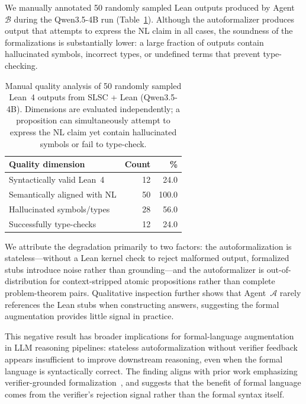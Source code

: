 We manually annotated 50 randomly sampled Lean outputs produced by Agent $\mathcal{B}$ during the Qwen3.5-4B run (Table~\ref{tab:lean_quality}). Although the autoformalizer produces output that attempts to express the NL claim in all cases, the soundness of the formalizations is substantially lower: a large fraction of outputs contain hallucinated symbols, incorrect types, or undefined terms that prevent type-checking.

\begin{table}[t]
  \centering
  \small
  \caption{Manual quality analysis of 50 randomly sampled Lean~4 outputs from SLSC + Lean (Qwen3.5-4B). Dimensions are evaluated independently; a proposition can simultaneously attempt to express the NL claim yet contain hallucinated symbols or fail to type-check.}
  \label{tab:lean_quality}
  \begin{tabular}{lrr}
    \toprule
    \textbf{Quality dimension} & \textbf{Count} & \textbf{\%} \\
    \midrule
    Syntactically valid Lean~4         & 12 & 24.0 \\
    Semantically aligned with NL       & 50 & 100.0 \\
    Hallucinated symbols/types         & 28 & 56.0 \\
    Successfully type-checks           & 12 & 24.0 \\
    \bottomrule
  \end{tabular}
\end{table}

We attribute the degradation primarily to two factors: the autoformalization is stateless---without a Lean kernel check to reject malformed output, formalized stubs introduce noise rather than grounding---and the autoformalizer is out-of-distribution for context-stripped atomic propositions rather than complete problem-theorem pairs. Qualitative inspection further shows that Agent~$\mathcal{A}$ rarely references the Lean stubs when constructing answers, suggesting the formal augmentation provides little signal in practice.

This negative result has broader implications for formal-language augmentation in LLM reasoning pipelines: stateless autoformalization without verifier feedback appears insufficient to improve downstream reasoning, even when the formal language is syntactically correct. The finding aligns with prior work emphasizing verifier-grounded formalization~\citep{jiang2023draft,yang2023leandojo}, and suggests that the benefit of formal language comes from the verifier's rejection signal rather than the formal syntax itself.

